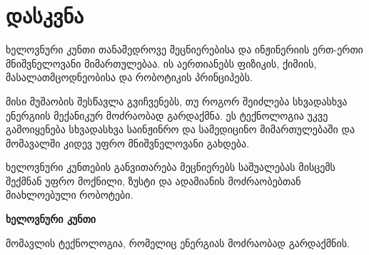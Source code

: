 \documentclass[12pt,a4paper]{article}
\begin{document}

\section{დასკვნა}

ხელოვნური კუნთი თანამედროვე მეცნიერებისა და ინჟინერიის ერთ-ერთი მნიშვნელოვანი მიმართულებაა. ის აერთიანებს ფიზიკის, ქიმიის, მასალათმცოდნეობისა და რობოტიკის პრინციპებს.

მისი მუშაობის შესწავლა გვიჩვენებს, თუ როგორ შეიძლება სხვადასხვა ენერგიის მექანიკურ მოძრაობად გარდაქმნა. ეს ტექნოლოგია უკვე გამოიყენება სხვადასხვა საინჟინრო და სამედიცინო მიმართულებაში და მომავალში კიდევ უფრო მნიშვნელოვანი გახდება.

ხელოვნური კუნთების განვითარება მეცნიერებს საშუალებას მისცემს შექმნან უფრო მოქნილი, ზუსტი და ადამიანის მოძრაობებთან მიახლოებული რობოტები.

\vspace{0.5cm}

\begin{center}
\begin{tcolorbox}[
colback=navy,
colframe=navy,
width=0.9\textwidth,
arc=3mm
]
\centering
\color{white}
\Large\bfseries
ხელოვნური კუნთი

\vspace{0.2cm}

\normalsize
მომავლის ტექნოლოგია, რომელიც ენერგიას მოძრაობად გარდაქმნის.
\end{tcolorbox}
\end{center}
\end{document}
